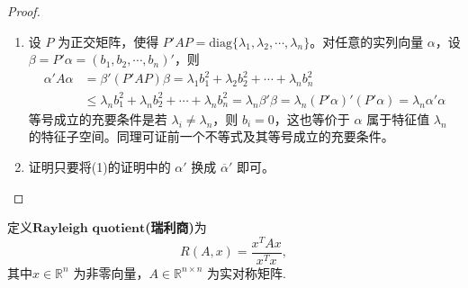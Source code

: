 \documentclass[../../main.tex]{subfiles}
\begin{document}
\begin{proof}
\begin{enumerate}[(1)]
\item 设 \(P\) 为正交矩阵，使得 \(P'AP = \mathrm{diag}\{\lambda_1,\lambda_2,\cdots,\lambda_n\}\)。对任意的实列向量 \(\alpha\)，设 \(\beta = P'\alpha = (b_1,b_2,\cdots,b_n)'\)，则
\begin{align*}
\alpha'A\alpha &= \beta'(P'AP)\beta = \lambda_1b_1^2 + \lambda_2b_2^2 + \cdots + \lambda_nb_n^2\\
&\leqslant  \lambda_nb_1^2 + \lambda_nb_2^2 + \cdots + \lambda_nb_n^2 = \lambda_n\beta'\beta = \lambda_n(P'\alpha)'(P'\alpha) = \lambda_n\alpha'\alpha
\end{align*}
等号成立的充要条件是若 \(\lambda_i \neq \lambda_n\)，则 \(b_i = 0\)，这也等价于 \(\alpha\) 属于特征值 \(\lambda_n\) 的特征子空间。同理可证前一个不等式及其等号成立的充要条件。

\item 证明只要将(1)的证明中的 \(\alpha'\) 换成 \(\overline{\alpha}'\) 即可。
\end{enumerate}

\end{proof}

\begin{definition}
定义$\mathbf{Rayleigh}\,\,\mathbf{quotient}$\textbf{(瑞利商)}为
\[
R(A, x) = \frac{x^T A x}{x^T x},
\]
其中\( x \in \mathbb{R}^n \) 为非零向量，\( A \in \mathbb{R}^{n \times n} \) 为实对称矩阵.
\end{definition}
\end{document}
